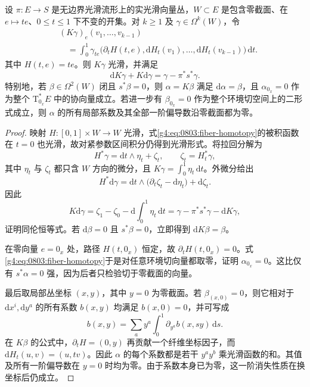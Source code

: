 \begin{lemma}[相对 Poincaré 引理]\label{g4:lem:0803:relative-poincare}
	设 \(\pi:E\to S\) 是无边界光滑流形上的实光滑向量丛，\(W\subset E\) 是包含零截面、在 \(e\mapsto te\)、\(0\le t\le1\) 下不变的开集。对 \(k\ge1\) 及 \(\gamma\in\Omega^k(W)\)，令
	\begin{equation}\label{g4:eq:0803:fiber-homotopy}
		\begin{aligned}
			&(K\gamma)_e(v_1,\ldots,v_{k-1})\\
			&\quad=\int_0^1\gamma_{te}\bigl(\partial_tH(t,e),\mathrm{d}H_t(v_1),\ldots,\mathrm{d}H_t(v_{k-1})\bigr)\,\mathrm{d}t.
		\end{aligned}
	\end{equation}
	其中 \(H(t,e)=te\)。则 \(K\gamma\) 光滑，并满足
	\begin{equation}\label{g4:eq:0803:homotopy-identity}
		\mathrm{d}K\gamma+K\mathrm{d}\gamma=\gamma-\pi^*s^*\gamma.
	\end{equation}
	特别地，若 \(\beta\in\Omega^2(W)\) 闭且 \(s^*\beta=0\)，则 \(\alpha=K\beta\) 满足 \(\mathrm{d}\alpha=\beta\)，且 \(\alpha_{0_x}=0\) 作为整个 \(\mathrm{T}_{0_x}^*E\) 中的协向量成立。若进一步有 \(\beta_{0_x}=0\) 作为整个环境切空间上的二形式成立，则 \(\alpha\) 的所有局部系数及其全部一阶偏导数沿零截面都为零。
\end{lemma}
\begin{proof}
	映射 \(H:[0,1]\times W\to W\) 光滑，式\eqref{g4:eq:0803:fiber-homotopy}的被积函数在 \(t=0\) 也光滑，故对紧参数区间积分仍得到光滑形式。将拉回分解为
	\[
		H^*\gamma=\mathrm{d}t\wedge\eta_t+\zeta_t,
		\qquad \zeta_t=H_t^*\gamma,
	\]
	其中 \(\eta_t\) 与 \(\zeta_t\) 都只含 \(W\) 方向的微分，且 \(K\gamma=\int_0^1\eta_t\,\mathrm{d}t\)。外微分给出
	\[
		H^*\mathrm{d}\gamma
		=\mathrm{d}t\wedge\bigl(\partial_t\zeta_t-\mathrm{d}\eta_t\bigr)+\mathrm{d}\zeta_t.
	\]
	因此
	\[
		K\mathrm{d}\gamma
		=\zeta_1-\zeta_0-\mathrm{d}\int_0^1\eta_t\,\mathrm{d}t
		=\gamma-\pi^*s^*\gamma-\mathrm{d}K\gamma,
	\]
	证明同伦恒等式。若 \(\mathrm{d}\beta=0\) 且 \(s^*\beta=0\)，立即得到 \(\mathrm{d}K\beta=\beta\)。

	在零向量 \(e=0_x\) 处，路径 \(H(t,0_x)\) 恒定，故 \(\partial_tH(t,0_x)=0\)。式\eqref{g4:eq:0803:fiber-homotopy}于是对任意环境切向量都取零，证明 \(\alpha_{0_x}=0\)。这比仅有 \(s^*\alpha=0\) 强，因为后者只检验切于零截面的向量。

	最后取局部丛坐标 \((x,y)\)，其中 \(y=0\) 为零截面。若 \(\beta_{(x,0)}=0\)，则它相对于 \(\mathrm{d}x^i,\mathrm{d}y^a\) 的所有系数 \(b(x,y)\) 均满足 \(b(x,0)=0\)，并可写成
	\[
		b(x,y)=\sum_a y^a\int_0^1\partial_{y^a}b(x,sy)\,\mathrm{d}s.
	\]
	在 \(K\beta\) 的公式中，\(\partial_tH=(0,y)\) 再贡献一个纤维坐标因子，而 \(\mathrm{d}H_t(u,v)=(u,tv)\)。因此 \(\alpha\) 的每个系数都是若干 \(y^ay^b\) 乘光滑函数的和。其值及所有一阶偏导数在 \(y=0\) 时均为零。由于系数本身已为零，这一阶消失性质在换坐标后仍成立。
\end{proof}

